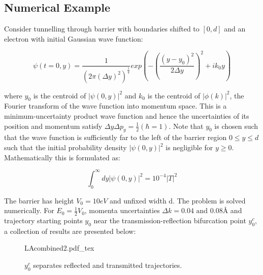 \documentclass{article}
\newcommand{\incfigsize}[2]{%
    \def\svgwidth{#2cm}
    {#1.pdf_tex}
}
\begin{document}
\subsection{Numerical Example}
\label{subsection:dBBexample}
\noindent Consider tunnelling through barrier with boundaries shifted to $[0, d]$ and an electron with initial Gaussian wave function:

\begin{equation}
	\psi(t=0,y) = \frac{1}{(2\pi(\Delta y)^2)^{\frac{1}{4}}}exp\left(-\left(\frac{(y-y_0)^2}{2\Delta y}\right)^2+ik_0y\right)
\end{equation}

\noindent where $y_0$ is the centroid of $|\psi(0,y)|^2$ and $k_0$ is the centroid of $|\phi(k)|^2$, the Fourier transform of the wave function into momentum space. This is a minimum-uncertainty product wave function and hence the uncertainties of its position and momentum satisfy $\Delta y\Delta p_y = \frac{1}{2} (\hbar = 1)$. Note that $y_0$ is chosen such that the wave function is sufficiently far to the left of the barrier region $0\leq y\leq d$ such that the initial probability density $|\psi(0,y)|^2$ is negligible for $y \geq 0$. Mathematically this is formulated as:

\begin{equation}
	\int_0^\infty dy |\psi(0,y)|^2 = 10^{-4}|T|^2
\end{equation}

\noindent The barrier has height $V_0 = 10eV$ and unfixed width d. The problem is solved numerically. For $E_0 = \frac{1}{2}V_0$, momenta uncertainties $\Delta k = 0.04 \text{ and } 0.08 \text{{\AA}}$ and trajectory starting points $y_0$ near the transmission-reflection bifurcation point $y_0^c$, a collection of results are presented below:

\begin{figure}[ht]
    \centering
    \incfigsize{LAcombined2}{15}
    \caption{$y_0^c$ separates reflected and transmitted trajectories.}
    \label{fig:trajectories111wrwd}
\end{figure}



\clearpage
\end{document}
